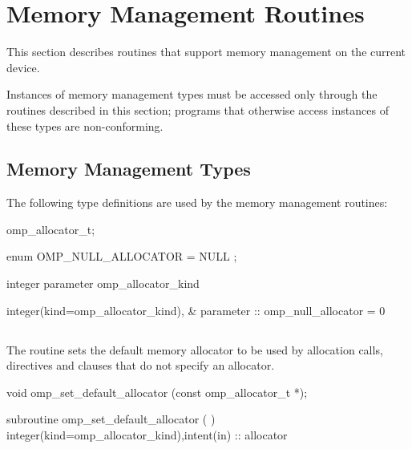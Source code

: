 \section{Memory Management Routines}
\label{sec:Memory Management Routines}
This section describes routines that support memory management on the current device.

Instances of memory management types must be accessed only through the routines described in this section; programs that otherwise access instances of these types are non-conforming.

\subsection{Memory Management Types}
\label{subsec:Memory Management Types}

The following type definitions are used by the memory management routines:

\begin{ccppspecific}
\begin{ompEnv}
omp_allocator_t;

enum { OMP_NULL_ALLOCATOR = NULL };
\end{ompEnv}
\end{ccppspecific}

\begin{fortranspecific}
\begin{ompfEnum}
integer parameter omp_allocator_kind

integer(kind=omp_allocator_kind), &
        parameter :: omp_null_allocator = 0
\end{ompfEnum}
\end{fortranspecific}

\subsection{}
\label{subsec:omp_set_default_allocator}

\summary
The  routine sets the default memory allocator to be used by allocation calls,  directives and  clauses that do not specify an allocator.

\format
\begin{ccppspecific}
\begin{ompcFunction}
void omp_set_default_allocator (const omp_allocator_t *);
\end{ompcFunction}
\end{ccppspecific}
\begin{fortranspecific}
\begin{ompfSubroutine}
subroutine omp_set_default_allocator (  )
integer(kind=omp_allocator_kind),intent(in) :: allocator
\end{ompfSubroutine}
\end{fortranspecific}

